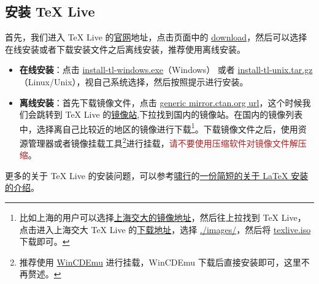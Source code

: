\documentclass[10pt,a4paper]{dlove}
\begin{document}
\subsection{安装 \TeX{} Live}
首先，我们进入 \TeX{} Live 的\href{https://www.tug.org/texlive/}{官网}地址，点击页面中的 \href{https://www.tug.org/texlive/acquire-netinstall.html}{download}，然后可以选择在线安装或者下载安装文件之后离线安装，推荐使用离线安装。
\begin{itemize}
  \item \textbf{在线安装}：点击 \href{http://mirror.ctan.org/systems/texlive/tlnet/install-tl-windows.exe}{install-tl-windows.exe}（Windows） 或者 \href{http://mirror.ctan.org/systems/texlive/tlnet/install-tl-unx.tar.gz}{install-tl-unix.tar.gz}（Linux/Unix），视自己系统选择，然后按照提示进行安装。
  \item \textbf{离线安装}：首先下载镜像文件，点击 \href{https://ctan.org/mirrors}{generic mirror.ctan.org url}，这个时候我们会跳转到 \TeX{} Live 的\href{https://ctan.org/mirrors}{镜像站},下拉找到国内的镜像站。在国内的镜像列表中，选择离自己比较近的地区的镜像进行下载\footnote{比如上海的用户可以选择\href{https://mirrors.sjtug.sjtu.edu.cn/ctan/}{上海交大的镜像地址}，然后往上拉找到 \TeX{} Live，点击进入上海交大 \TeX{} Live 的\href{https://mirrors.sjtug.sjtu.edu.cn/ctan/systems/texlive/}{下载地址}，选择 \href{https://mirrors.sjtug.sjtu.edu.cn/ctan/systems/texlive/Images/}{./images/}，然后将 \href{https://mirrors.sjtug.sjtu.edu.cn/ctan/systems/texlive/Images/texlive.iso}{texlive.iso}下载即可。}。下载镜像文件之后，使用资源管理器或者镜像挂载工具\footnote{推荐使用 \href{http://wincdemu.sysprogs.org/}{WinCDEmu} 进行挂载，WinCDEmu 下载后直接安装即可，这里不再赘述。}进行挂载，\textsf{\textcolor{FireBrick}{请不要使用压缩软件对镜像文件解压缩}}。
\end{itemize}

更多的关于 \TeX{} Live 的安装问题，可以参考\href{https://github.com/OsbertWang}{啸行}的\href{https://github.com/OsbertWang/install-latex}{一份简短的关于 \LaTeX{} 安装的介绍}。
\end{document}
